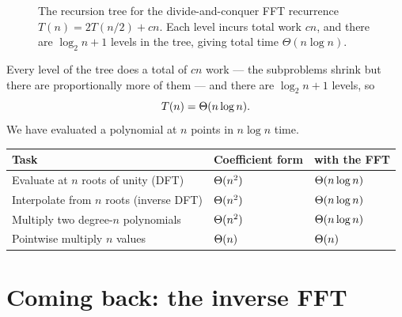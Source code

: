 \begin{figure}[H]
\centering
{}
\caption{The recursion tree for the divide-and-conquer FFT recurrence $T(n) = 2T(n/2) + cn$.
Each level incurs total work $cn$, and there are $\log_2 n + 1$ levels in the tree,
giving total time $\Theta(n\log n)$.}
\label{ch29:fig-recursion-tree}
\end{figure}

Every level of the tree does a total of $cn$ work --- the subproblems shrink but
there are proportionally more of them --- and there are $\log_2 n + 1$ levels, so
\[
T(n) = \Theta(n\log n).
\]
We have evaluated a polynomial at $n$ points in $n\log n$ time.

\begin{complexitybox}
\begin{tabular}{lll}
\toprule
Task & Coefficient form & with the FFT \\
\midrule
Evaluate at $n$ roots of unity (DFT) & $\Theta(n^2)$ & $\Theta(n\log n)$ \\
Interpolate from $n$ roots (inverse DFT) & $\Theta(n^2)$ & $\Theta(n\log n)$ \\
Multiply two degree-$n$ polynomials & $\Theta(n^2)$ & $\Theta(n\log n)$ \\
Pointwise multiply $n$ values & $\Theta(n)$ & $\Theta(n)$ \\
\bottomrule
\end{tabular}
\end{complexitybox}

\section{Coming back: the inverse FFT}


